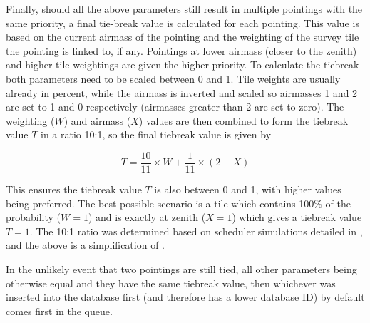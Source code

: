 \begin{colsection}
\begin{colsection}
Finally, should all the above parameters still result in multiple pointings with the same priority, a final tie-break value is calculated for each pointing. This value is based on the current airmass of the pointing and the weighting of the survey tile the pointing is linked to, if any. Pointings at lower airmass (closer to the zenith) and higher tile weightings are given the higher priority. To calculate the tiebreak both parameters need to be scaled between 0 and 1. Tile weights are usually already in percent, while the airmass is inverted and scaled so airmasses 1 and 2 are set to 1 and 0 respectively (airmasses greater than 2 are set to zero). The weighting ($W$) and airmass ($X$) values are then combined to form the tiebreak value $T$ in a ratio 10:1, so the final tiebreak value is given by

\begin{equation}
    T = \frac{10}{11} \times W + \frac{1}{11} \times (2 - X)
    \label{eq:tiebreak}
\end{equation}

This ensures the tiebreak value $T$ is also between 0 and 1, with higher values being preferred. The best possible scenario is a tile which contains 100\% of the probability ($W=1$) and is exactly at zenith ($X=1$) which gives a tiebreak value $T=1$. The 10:1 ratio was determined based on scheduler simulations detailed in , and the above  is a simplification of .

In the unlikely event that two pointings are still tied, all other parameters being otherwise equal and they have the same tiebreak value, then whichever was inserted into the database first (and therefore has a lower database ID) by default comes first in the queue.

\newpage


\end{colsection}
\end{colsection}
